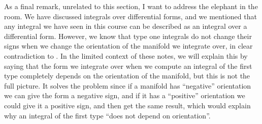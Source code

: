 \documentclass[11pt,a4paper]{article}
\begin{document}
\begin{remark}
  As a final remark, unrelated to this section,
  I want to address the elephant in the room.
  We have discussed integrals over differential forms,
  and we mentioned that any integral we have seen in this course
  can be described as an integral over a differential form.
  However, we know that type one integrals do not change their signs
  when we change the orientation of the manifold we integrate over,
  in clear contradiction to .
  In the limited context of these notes,
  we will explain this by saying that the form we integrate over when we compute
  an integral of the first type completely depends on the orientation
  of the manifold, but this is not the full picture.
  It solves the problem since if a manifold has ``negative'' orientation
  we can give the form a negative sign, and if it has a ``positive''
  orientation we could give it a positive sign, and then get the same
  result, which would explain why an integral of the first
  type ``does not depend on orientation''.
\end{remark}

\end{document}
